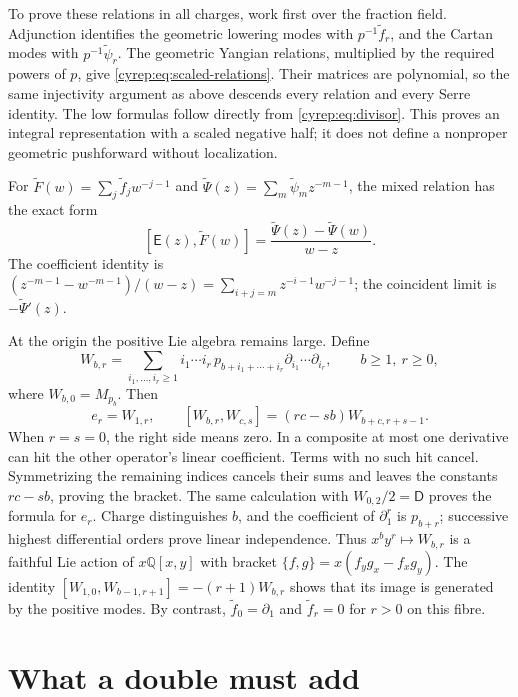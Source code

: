 To prove these relations in all charges, work first over the fraction
field. Adjunction identifies the geometric lowering modes with
\(p^{-1}\widetilde f_r\), and the Cartan modes with
\(p^{-1}\widetilde\psi_r\). The geometric Yangian relations,
multiplied by the required powers of \(p\), give
\eqref{cyrep:eq:scaled-relations}.
Their matrices are polynomial, so the same injectivity argument
as above descends every relation and every Serre identity.
The low formulas follow directly from \eqref{cyrep:eq:divisor}.
This proves an integral representation with a scaled negative half;
it does not define a nonproper geometric pushforward without
localization.

For
\(\widetilde F(w)=\sum_j\widetilde f_jw^{-j-1}\) and
\(\widetilde\Psi(z)=\sum_m\widetilde\psi_mz^{-m-1}\), the mixed
relation has the exact form
\begin{equation}\label{cyrep:eq:mixed-current}
 [\mathsf E(z),\widetilde F(w)]
       =\frac{\widetilde\Psi(z)-\widetilde\Psi(w)}{w-z}.
\end{equation}
The coefficient identity is
\((z^{-m-1}-w^{-m-1})/(w-z)
=\sum_{i+j=m}z^{-i-1}w^{-j-1}\);
the coincident limit is \(-\widetilde\Psi'(z)\).

At the origin the positive Lie algebra remains large. Define
\[
 W_{b,r}=\sum_{i_1,\ldots,i_r\geq1}
 i_1\cdots i_r\,p_{b+i_1+\cdots+i_r}
                    \partial_{i_1}\cdots\partial_{i_r},
 \qquad b\geq1,\ r\geq0,
\]
where \(W_{b,0}=M_{p_b}\).
Then
\begin{equation}\label{cyrep:eq:origin-lie}
 e_r=W_{1,r},\qquad
 [W_{b,r},W_{c,s}]=(rc-sb)W_{b+c,r+s-1}.
\end{equation}
When \(r=s=0\), the right side means zero.
In a composite at most one derivative can hit the other operator's
linear coefficient. Terms with no such hit cancel.
Symmetrizing the remaining indices cancels their sums and leaves
the constants \(rc-sb\), proving the bracket.
The same calculation with \(W_{0,2}/2=\mathsf D\) proves the
formula for \(e_r\).
Charge distinguishes \(b\), and the coefficient of
\(\partial_1^r\) is \(p_{b+r}\); successive highest differential
orders prove linear independence.
Thus \(x^by^r\mapsto W_{b,r}\) is a faithful Lie action of
\(x\mathbb Q[x,y]\) with bracket
\(\{f,g\}=x(f_y g_x-f_x g_y)\).
The identity
\([W_{1,0},W_{b-1,r+1}]=-(r+1)W_{b,r}\)
shows that its image is generated by the positive modes.
By contrast, \(\widetilde f_0=\partial_1\) and
\(\widetilde f_r=0\) for \(r>0\) on this fibre.

\section{What a double must add}
\label{cyrep:sec:double-data}

